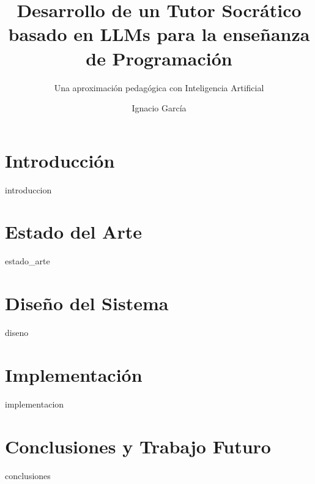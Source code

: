 \documentclass[epsbased,copyright,final,printable,covers,extendedindex,firstnumbered,tfg]{tfgtfmthesisuam}
\title{Desarrollo de un Tutor Socrático basado en LLMs para la enseñanza de Programación}
\subtitle{Una aproximación pedagógica con Inteligencia Artificial}  %
\author{Ignacio García}
\begin{document}
\chapter{Introducción\label{CAP:INTRO}}{introduccion}
\chapter{Estado del Arte\label{CAP:ESTADO_ARTE}}{estado_arte}
\chapter{Diseño del Sistema\label{CAP:DISENO}}{diseno}
\chapter{Implementación\label{CAP:IMPLEMENTACION}}{implementacion}
\chapter{Conclusiones y Trabajo Futuro\label{CAP:CONCLUSIONES}}{conclusiones}
\end{document}

